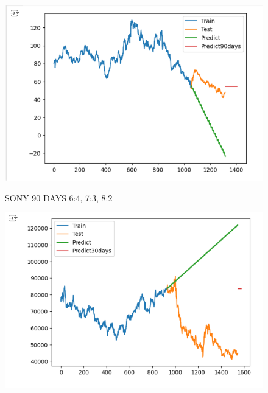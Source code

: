 \documentclass{article}
\begin{document}
\begin{multicols}{2}
\begin{figure}[H]
\begin{minipage}{0.15\textwidth}
    \label{fig:2}
    \end{minipage}%
    \begin{minipage}{0.15\textwidth}
    \centering
    \includegraphics[width=1\textwidth]{Image/ARIMA/90_8_2_SONY_Arima.png}

    \label{fig:3}
    \end{minipage}
    \caption{SONY 90 DAYS  6:4, 7:3, 8:2 }
\end{figure}


\begin{figure}[H]
    \centering
    \begin{minipage}{0.15\textwidth}
    \centering
    \includegraphics[width=1\textwidth]{Image/ARIMA/30_6_4_SAMSUNG_Arima.png}
   

\end{minipage}
\end{figure}
\end{multicols}
\end{document}
